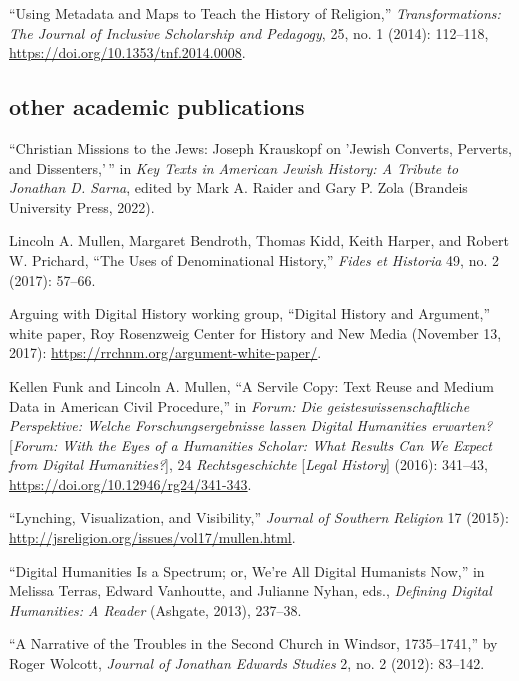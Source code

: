 \documentclass[11pt]{article}
\begin{document}
``Using Metadata and Maps to Teach the History of Religion,'' \emph{Transformations: The Journal of Inclusive Scholarship and Pedagogy}, 25, no. 1 (2014): 112--118, \url{https://doi.org/10.1353/tnf.2014.0008}.


\subsection{other academic publications}\label{other-academic}

``Christian Missions to the Jews: Joseph Krauskopf on 'Jewish Converts, Perverts, and Dissenters,'\,'' in \emph{Key Texts in American Jewish History: A Tribute to Jonathan D. Sarna}, edited by Mark A. Raider and Gary P. Zola (Brandeis University Press, 2022).

Lincoln A. Mullen, Margaret Bendroth, Thomas Kidd, Keith Harper, and Robert W. 
Prichard, ``The Uses of Denominational History,'' \emph{Fides et Historia} 49, 
no. 2 (2017): 57--66.

Arguing with Digital History working group, ``Digital History and Argument,'' 
white paper, Roy Rosenzweig Center for History and New Media (November 13, 
2017): \url{https://rrchnm.org/argument-white-paper/}.

Kellen Funk and Lincoln A. Mullen, ``A Servile Copy: Text Reuse and Medium Data 
in American Civil Procedure,'' in \emph{Forum: Die geisteswissenschaftliche 
  Perspektive: Welche Forschungsergebnisse lassen Digital Humanities 
  erwarten?} [\emph{Forum: With the Eyes of a Humanities Scholar: What Results 
  Can We Expect from Digital Humanities?}], 24 \emph{Rechtsgeschichte} 
[\emph{Legal History}] (2016): 341--43, 
\url{https://doi.org/10.12946/rg24/341-343}.

``Lynching, Visualization, and Visibility,'' \emph{Journal of Southern 
  Religion} 17 (2015): \url{http://jsreligion.org/issues/vol17/mullen.html}.

``Digital Humanities Is a Spectrum; or, We're All Digital Humanists
Now,'' in Melissa Terras, Edward Vanhoutte, and Julianne Nyhan, eds.,
\emph{Defining Digital Humanities: A Reader} (Ashgate, 2013), 237--38.

``A Narrative of the Troubles in the Second Church in Windsor,
1735--1741,'' by Roger Wolcott, \emph{Journal of Jonathan Edwards
  Studies} 2, no. 2 (2012): 83--142.
\end{document}
